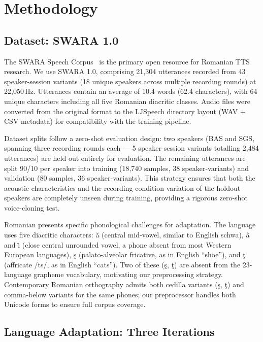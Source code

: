 \documentclass[conference]{IEEEtran}
\begin{document}
\section{Methodology}
\label{sec:method}

\subsection{Dataset: SWARA 1.0}

The SWARA Speech Corpus~\cite{swara} is the primary open resource
for Romanian TTS research.
We use SWARA 1.0, comprising 21,304 utterances recorded from 43
speaker-session variants (18 unique speakers across multiple
recording rounds) at 22,050\,Hz.
Utterances contain an average of 10.4 words (62.4 characters), with
64 unique characters including all five Romanian diacritic classes.
Audio files were converted from the original format to the LJSpeech
directory layout (WAV + CSV metadata) for compatibility with the
training pipeline.

Dataset splits follow a zero-shot evaluation design: two speakers
(BAS and SGS, spanning three recording rounds each — 5 speaker-session
variants totalling 2,484 utterances) are held out entirely for
evaluation.
The remaining utterances are split 90/10 per speaker into
training (18,740 samples, 38 speaker-variants) and validation
(80 samples, 36 speaker-variants).
This strategy ensures that both the acoustic characteristics and
the recording-condition variation of the holdout speakers are
completely unseen during training, providing a rigorous zero-shot
voice-cloning test.

Romanian presents specific phonological challenges for adaptation.
The language uses five diacritic characters: \u{a} (central
mid-vowel, similar to English schwa), \^{a} and \^{\i} (close central
unrounded vowel, a phone absent from most Western European languages),
\c{s} (palato-alveolar fricative, as in English ``shoe''), and
\c{t} (affricate /ts/, as in English ``cats'').
Two of these (\c{s}, \c{t}) are absent from the 23-language
grapheme vocabulary, motivating our preprocessing strategy.
Contemporary Romanian orthography admits both cedilla variants
(\c{s}, \c{t}) and comma-below variants for the same phones; our
preprocessor handles both Unicode forms to ensure full corpus coverage.

\subsection{Language Adaptation: Three Iterations}
\end{document}
